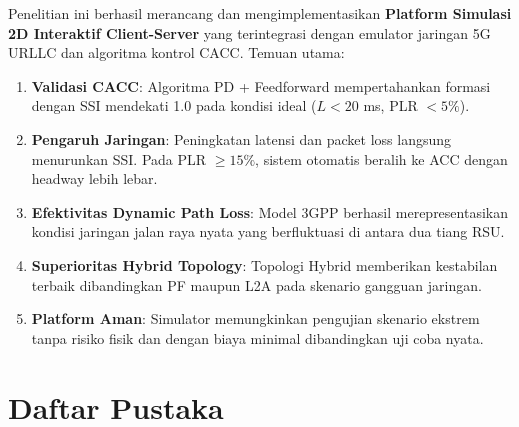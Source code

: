 \documentclass[12pt,a4paper]{article}
\begin{document}
Penelitian ini berhasil merancang dan mengimplementasikan \textbf{Platform Simulasi 2D
Interaktif Client-Server} yang terintegrasi dengan emulator jaringan 5G URLLC dan
algoritma kontrol CACC. Temuan utama:

\begin{enumerate}
  \item \textbf{Validasi CACC}: Algoritma PD + Feedforward mempertahankan formasi dengan
        SSI mendekati 1.0 pada kondisi ideal ($L < 20$ ms, PLR $< 5\%$).

  \item \textbf{Pengaruh Jaringan}: Peningkatan latensi dan packet loss langsung menurunkan
        SSI. Pada PLR $\geq 15\%$, sistem otomatis beralih ke ACC dengan headway lebih lebar.

  \item \textbf{Efektivitas Dynamic Path Loss}: Model 3GPP berhasil merepresentasikan kondisi
        jaringan jalan raya nyata yang berfluktuasi di antara dua tiang RSU.

  \item \textbf{Superioritas Hybrid Topology}: Topologi Hybrid memberikan kestabilan terbaik
        dibandingkan PF maupun L2A pada skenario gangguan jaringan.

  \item \textbf{Platform Aman}: Simulator memungkinkan pengujian skenario ekstrem tanpa
        risiko fisik dan dengan biaya minimal dibandingkan uji coba nyata.
\end{enumerate}

\section*{Daftar Pustaka}
\end{document}
